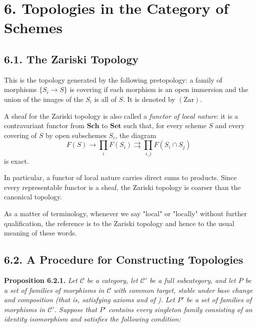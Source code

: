 
\section*{6. Topologies in the Category of Schemes}

\subsection*{6.1. The Zariski Topology}

This is the topology generated by the following pretopology: a family of
morphisms \(\{S_i\to S\}\) is covering if each morphism is an open
immersion and the union of the images of the \(S_i\) is all of \(S\). It is
denoted by \((\mathrm{Zar})\).

A sheaf for the Zariski topology is also called a \emph{functor of
local nature}: it is a contravariant functor from \(\mathbf{Sch}\) to
\(\mathbf{Set}\) such that, for every scheme \(S\) and every covering of
\(S\) by open subschemes \(S_i\), the diagram
\[
  F(S)\longrightarrow\prod_iF(S_i)
  \rightrightarrows\prod_{i,j}F(S_i\cap S_j)
\]
is exact.

In particular, a functor of local nature carries direct sums to products.
Since every representable functor is a sheaf, the Zariski topology is
coarser than the canonical topology.

As a matter of terminology, whenever we say "local" or "locally" without
further qualification, the reference is to the Zariski topology and hence
to the usual meaning of these words.

\subsection*{6.2. A Procedure for Constructing Topologies}

\medskip
\noindent{}\textbf{Proposition 6.2.1.}
\textit{Let \(\mathscr C\) be a category, let \(\mathscr C'\) be a full
subcategory, and let \(P\) be a set of families of morphisms in
\(\mathscr C\) with common target, stable under base change and composition
(that is, satisfying axioms  and  of ). Let \(P'\) be a set
of families of morphisms in \(\mathscr C'\). Suppose that \(P'\) contains
every singleton family consisting of an identity isomorphism  and
satisfies the following condition:}

